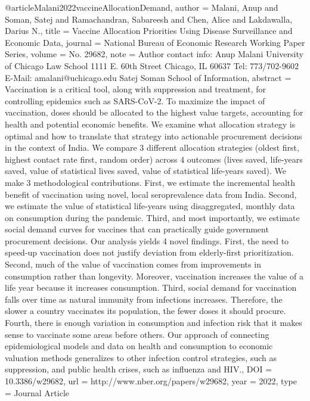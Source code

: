 {{{{@article{Malani2022vaccineAllocationDemand,
   author = {Malani, Anup and Soman, Satej and Ramachandran, Sabareesh and Chen, Alice and Lakdawalla, Darius N.},
   title = {Vaccine Allocation Priorities Using Disease Surveillance and Economic Data},
   journal = {National Bureau of Economic Research Working Paper Series},
   volume = {No. 29682},
   note = {Author contact info: Anup Malani University of Chicago Law School 1111 E. 60th Street Chicago, IL 60637 Tel: 773/702-9602 E-Mail: amalani@uchicago.edu Satej Soman School of Information},
   abstract = {Vaccination is a critical tool, along with suppression and treatment, for controlling epidemics such as SARS-CoV-2. To maximize the impact of vaccination, doses should be allocated to the highest value targets, accounting for health and potential economic benefits. We examine what allocation strategy is optimal and how to translate that strategy into actionable procurement decisions in the context of India. We compare 3 different allocation strategies (oldest first, highest contact rate first, random order) across 4 outcomes (lives saved, life-years saved, value of statistical lives saved, value of statistical life-years saved). We make 3 methodological contributions. First, we estimate the incremental health benefit of vaccination using novel, local seroprevalence data from India. Second, we estimate the value of statistical life-years using disaggregated, monthly data on consumption during the pandemic. Third, and most importantly, we estimate social demand curves for vaccines that can practically guide government procurement decisions. Our analysis yields 4 novel findings. First, the need to speed-up vaccination does not justify deviation from elderly-first prioritization. Second, much of the value of vaccination comes from improvements in consumption rather than longevity. Moreover, vaccination increases the value of a life year because it increases consumption. Third, social demand for vaccination falls over time as natural immunity from infections increases. Therefore, the slower a country vaccinates its population, the fewer doses it should procure. Fourth, there is enough variation in consumption and infection risk that it makes sense to vaccinate some areas before others. Our approach of connecting epidemiological models and data on health and consumption to economic valuation methods generalizes to other infection control strategies, such as suppression, and public health crises, such as influenza and HIV.},
   DOI = {10.3386/w29682},
   url = {http://www.nber.org/papers/w29682},
   year = {2022},
   type = {Journal Article}
}



}}}}
